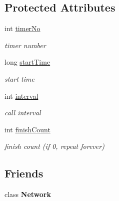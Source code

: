 \subsection*{Protected Attributes}
\begin{DoxyCompactItemize}
\item 
\mbox{\label{class_c_g_1_1_timer_abfdeae7f34cf1b733164663f35a9fad6}} 
int \mbox{\hyperlink{class_c_g_1_1_timer_abfdeae7f34cf1b733164663f35a9fad6}{timer\+No}}
\begin{DoxyCompactList}\small\item\em timer number \end{DoxyCompactList}\item 
\mbox{\label{class_c_g_1_1_timer_a588bc101181b05cdbce6f1e337196576}} 
long \mbox{\hyperlink{class_c_g_1_1_timer_a588bc101181b05cdbce6f1e337196576}{start\+Time}}
\begin{DoxyCompactList}\small\item\em start time \end{DoxyCompactList}\item 
\mbox{\label{class_c_g_1_1_timer_ab58548090a3a08718a4394a4b110e7b0}} 
int \mbox{\hyperlink{class_c_g_1_1_timer_ab58548090a3a08718a4394a4b110e7b0}{interval}}
\begin{DoxyCompactList}\small\item\em call interval \end{DoxyCompactList}\item 
\mbox{\label{class_c_g_1_1_timer_a907a526179fdcc32c4e2201b482a9625}} 
int \mbox{\hyperlink{class_c_g_1_1_timer_a907a526179fdcc32c4e2201b482a9625}{finish\+Count}}
\begin{DoxyCompactList}\small\item\em finish count (if 0, repeat forever) \end{DoxyCompactList}\end{DoxyCompactItemize}
\subsection*{Friends}
\begin{DoxyCompactItemize}
\item 
\mbox{\label{class_c_g_1_1_timer_a88b59289ffd793fecd040d32e397b1e9}} 
class {\bfseries Network}
\end{DoxyCompactItemize}


